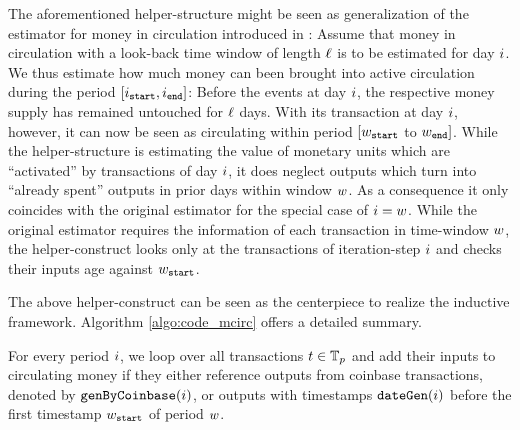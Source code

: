 The aforementioned helper-structure might be seen as generalization of the estimator for money in circulation introduced in \cite{pernice2019cryptocurrencies}: %
Assume that money in circulation with a look-back time window of length \({\ell}\) is to be estimated for day \({i}\). %
We thus estimate how much money can been brought into active circulation during the period \([{i}_{{\mathtt{start}}},{i}_{{\mathtt{end}}}]\): Before the events at day \({i}\), the respective money supply has remained untouched for \({\ell}\) days. With its transaction at day \({i}\), however, it can now be seen as circulating within period  \([{w}_{\mathtt{start}}\) to \({w}_{\mathtt{end}}]\). %
While the helper-structure is estimating the value of monetary units which are ``activated'' by transactions of day \( {i} \), it does neglect outputs which turn into ``already spent'' outputs in prior days within window \({w}\). %
As a consequence it only coincides with the original estimator for the special case of \({i} = {w}\). %
While the original estimator requires the information of each transaction in time-window \({w}\), the helper-construct looks only at the transactions of iteration-step \({i}\) and checks their inputs age against \({w}_{\mathtt{start}}\). %

The above helper-construct can be seen as the centerpiece to realize the inductive framework. %
Algorithm \ref{algo:code_mcirc} offers a detailed summary. %

For every period ${i}$, we loop over all transactions $t\in{{\mathbb{T}}_{p}}$ and add
their inputs to circulating money if they either reference outputs from
coinbase transactions, denoted by ${\mathtt{genByCoinbase}}(i)$, or outputs with
timestamps ${\mathtt{dateGen}}(i)$ before the first timestamp ${w}_{\mathtt{start}}$ of period
${w}$.  %
%
%
%





